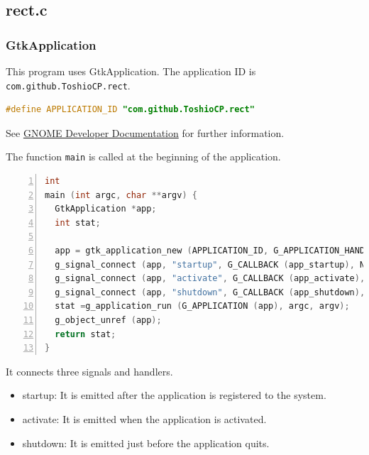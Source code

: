 \subsection{rect.c}\label{rect.c}

\subsubsection{GtkApplication}\label{gtkapplication}

This program uses GtkApplication. The application ID is
\passthrough{\lstinline!com.github.ToshioCP.rect!}.

\begin{lstlisting}[language=C]
#define APPLICATION_ID "com.github.ToshioCP.rect"
\end{lstlisting}

See
\href{https://developer.gnome.org/documentation/tutorials/application-id.html}{GNOME
Developer Documentation} for further information.

The function \passthrough{\lstinline!main!} is called at the beginning
of the application.

\begin{lstlisting}[language=C, numbers=left]
int
main (int argc, char **argv) {
  GtkApplication *app;
  int stat;

  app = gtk_application_new (APPLICATION_ID, G_APPLICATION_HANDLES_OPEN);
  g_signal_connect (app, "startup", G_CALLBACK (app_startup), NULL);
  g_signal_connect (app, "activate", G_CALLBACK (app_activate), NULL);
  g_signal_connect (app, "shutdown", G_CALLBACK (app_shutdown), NULL);
  stat =g_application_run (G_APPLICATION (app), argc, argv);
  g_object_unref (app);
  return stat;
}
\end{lstlisting}

It connects three signals and handlers.

\begin{itemize}
\tightlist
\item
  startup: It is emitted after the application is registered to the
  system.
\item
  activate: It is emitted when the application is activated.
\item
  shutdown: It is emitted just before the application quits.
\end{itemize}

